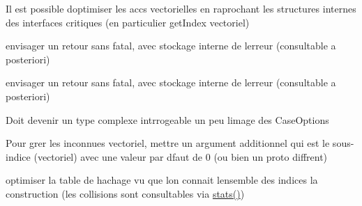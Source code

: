 
\begin{DoxyRefList}
\item[Class \mbox{\hyperlink{classBasicIndexManager}{Basic\+Index\+Manager}} ]\label{todo__todo000003}%
%
Il est possible d\textquotesingle{}optimiser les acc{\ucr}s vectorielles en raprochant les structures internes des interfaces critiques (en particulier get\+Index vectoriel)  
\item[Member \mbox{\hyperlink{structFunctionParser_ae2cdbc565a026ee6db3aa016ce4271cb}{Function\+Parser\+::parse\+String}} (const String \&s)]\label{todo__todo000005}%
%
envisager un retour sans fatal, avec stockage interne de l\textquotesingle{}erreur (consultable a posteriori) 

\label{todo__todo000006}%
%
envisager un retour sans fatal, avec stockage interne de l\textquotesingle{}erreur (consultable a posteriori)  
\item[Member \mbox{\hyperlink{classIBaseLinearSolver_a09622601dba23ea77701753cf49b2bf0}{IBase\+Linear\+Solver\+::Status}} ]\label{todo__todo000007}%
%
Doit devenir un type complexe int{\ucr}rrogeable un peu {\ucr} l\textquotesingle{}image des Case\+Options  
\item[Class \mbox{\hyperlink{classIIndexManager}{IIndex\+Manager}} ]\label{todo__todo000004}%
%
Pour g{\ucr}rer les inconnues vectoriel, mettre un argument additionnel qui est le sous-\/indice (vectoriel) avec une valeur par d{\ucr}faut de 0 (ou bien un proto diff{\ucr}rent)  
\item[Class \mbox{\hyperlink{classItemGroupMapAbstract}{Item\+Group\+Map\+Abstract}} ]\label{todo__todo000008}%
%
optimiser la table de hachage vu que l\textquotesingle{}on connait l\textquotesingle{}ensemble des indices {\ucr} la construction (les collisions sont consultables via \mbox{\hyperlink{classItemGroupMapAbstract_aa5ea20f4623f6765a9ce7a4dacf7bef5}{stats()}}) 
\end{DoxyRefList}